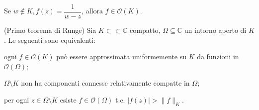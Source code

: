 \begin{ex}
  Se $w \not\in K, f(z)=\dfrac{1}{w-z}$, allora $f \in \mathcal{O}(K)$.
\end{ex}

\begin{thm}
  (Primo teorema di Runge) Sia $K \subset\subset \mathbb{C}$ compatto, $\Omega \subseteq \mathbb{C}$ un intorno aperto di $K$. Le seguenti sono equivalenti:
  \begin{nlist}
    \item ogni $f \in \mathcal{O}(K)$ può essere approssimata uniformemente su $K$ da funzioni in $\mathcal{O}(\Omega)$;
    \item $\Omega \setminus K$ non ha componenti connesse relativamente compatte in $\Omega$;
    \item per ogni $z \in \Omega \setminus K$ esiste $f \in \mathcal{O}(\Omega)$ t.c. $|f(z)|>\|f\|_K$.
  \end{nlist}
\end{thm}

